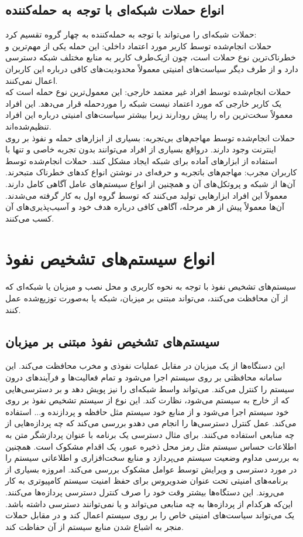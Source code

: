 \documentclass[a4paper,oneside,12pt]{report}
\begin{document}
 \subsection{انواع حملات شبکه‌ای با توجه به حمله‌کننده}
  حملات شبکه‌ای را می‌تواند با توجه به حمله‌کننده به چهار گروه تقسیم کرد:
  \\[0.5cm]
 حملات انجام‌شده توسط کاربر مورد اعتماد داخلی: این حمله یکی از مهم‌ترین و خطرناک‌ترین نوع حملات است، چون ازیک‌طرف کاربر به منابع مختلف شبکه دسترسی دارد و از طرف دیگر سیاست‌های امنیتی معمولاً محدودیت‌های کافی درباره این کاربران اعمال نمی‌کنند.
 \\[0.5cm]
 حملات انجام‌شده توسط افراد غیر معتمد خارجی: این معمول‌ترین نوع حمله است که یک کاربر خارجی که مورد اعتماد نیست شبکه را موردحمله قرار می‌دهد. این افراد معمولاً سخت‌ترین راه را پیش رودارند زیرا بیشتر سیاست‌های امنیتی درباره این افراد تنظیم‌شده‌اند.
 \\[0.5cm]
حملات انجام‌شده توسط مهاجم‌های بی‌تجربه: بسیاری از ابزارهای حمله و نفوذ بر روی اینترنت وجود دارند. درواقع بسیاری از افراد می‌توانند بدون تجربه خاصی و تنها با استفاده از ابزارهای آماده برای شبکه ایجاد مشکل کنند. حملات انجام‌شده توسط کاربران مجرب: مهاجم‌های باتجربه و حرفه‌ای در نوشتن انواع کدهای خطرناک متبحرند. آن‌ها از شبکه و پروتکل‌های آن و همچنین از انواع سیستم‌های عامل آگاهی کامل دارند. معمولاً این افراد ابزارهایی تولید می‌کنند که توسط گروه اول به کار گرفته می‌شدند. آن‌ها معمولاً پیش از هر مرحله، آگاهی کافی درباره هدف خود و آسیب‌پذیری‌های آن کسب می‌کنند.
\section{انواع سیستم‌های تشخیص نفوذ}
 سیستم‌های تشخیص نفوذ با توجه به نحوه کاربری و محل نصب و میزبان یا شبکه‌ای که از آن محافظت می‌کنند، می‌تواند مبتنی بر میزبان، شبکه یا به‌صورت توزیع‌شده عمل کنند.
 \subsection{سیستم‌های تشخیص نفوذ مبتنی بر میزبان}
 این دستگاه‌ها از یک میزبان در مقابل عملیات نفوذی و مخرب محافظت می‌کند. این سامانه محافظتی بر روی سیستم اجرا می‌شود و تمام فعالیت‌ها و فرآیندهای درون سیستم را کنترل می‌کند. 
 می‌تواند واسط شبکه‌ای را نیز پویش دهد و بر دسترسی‌هایی که از خارج به سیستم می‌شود، نظارت کند. این نوع از سیستم تشخیص نفوذ بر روی خود سیستم اجرا می‌شود و از منابع خود سیستم مثل حافظه و پردازنده و... استفاده می‌کند. 
 عمل کنترل دسترسی‌ها را انجام می دهدو بررسی می‌کند که چه پردازه‌هایی از چه منابعی استفاده می‌کنند. برای مثال دسترسی یک برنامه با عنوان پردازشگر متن به اطلاعات حساس سیستم مثل رمز محل ذخیره عبور، یک اقدام مشکوک است. همچنین به بررسی مداوم وضعیت سیستم می‌پردازد و منابع سخت‌افزاری و اطلاعاتی سیستم را در مورد دسترسی و ویرایش توسط عوامل مشکوک بررسی می‌کند. امروزه بسیاری از برنامه‌های امنیتی تحت عنوان ضدویروس برای حفظ امنیت سیستم کامپیوتری به کار می‌روند. این دستگاه‌ها بیشتر وقت خود را صرف کنترل دسترسی پردازه‌ها می‌کنند. این‌که هرکدام از پردازه‌ها به چه منابعی می‌تواند و یا نمی‌توانند دسترسی داشته باشد. یک 
 می‌تواند سیاست‌های امنیتی خاص را بر روی سیستم اعمال کند و در مقابل حملات منجر به اشباع شدن منابع سیستم از آن حفاظت کند.
 
\end{document}
